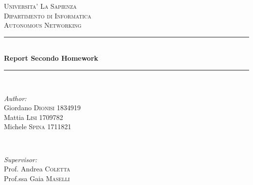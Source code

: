 \documentclass[12pt]{article}
\begin{document}
\begin{titlepage}

\newcommand{\HRule}{\rule{\linewidth}{0.5mm}} %

\center %
 

\textsc{\LARGE Universita' La Sapienza}\\[1.5cm] %
\textsc{\Large Dipartimento di Informatica}\\[0.5cm] %
\textsc{\large Autonomous Networking}\\[0.5cm] %


\HRule \\[0.4cm]
{ \huge \bfseries Report Secondo Homework}\\[0.4cm] %
\HRule \\[1.5cm]
 

\begin{minipage}{0.4\textwidth}
\begin{flushleft} \large
\emph{Author:}\\
Giordano \textsc{Dionisi} 1834919 \\

Mattia \textsc{Lisi} 1709782 \\

Michele \textsc{Spina} 1711821

\end{flushleft}
\end{minipage}
~
\begin{minipage}{0.4\textwidth}
\begin{flushright} \large
\emph{Supervisor:} \\
Prof. Andrea \textsc{Coletta} \\%
Prof.ssa Gaia \textsc{Maselli} %


\end{flushright}
\end{minipage}
\end{titlepage}
\end{document}

